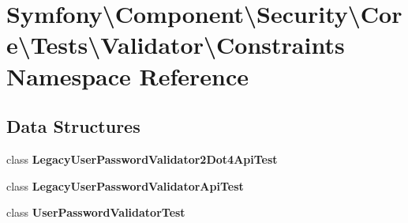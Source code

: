 \section{Symfony\textbackslash{}Component\textbackslash{}Security\textbackslash{}Core\textbackslash{}Tests\textbackslash{}Validator\textbackslash{}Constraints Namespace Reference}
\label{namespace_symfony_1_1_component_1_1_security_1_1_core_1_1_tests_1_1_validator_1_1_constraints}
\subsection*{Data Structures}
\begin{DoxyCompactItemize}
\item 
class {\bf Legacy\+User\+Password\+Validator2\+Dot4\+Api\+Test}
\item 
class {\bf Legacy\+User\+Password\+Validator\+Api\+Test}
\item 
class {\bf User\+Password\+Validator\+Test}
\end{DoxyCompactItemize}
